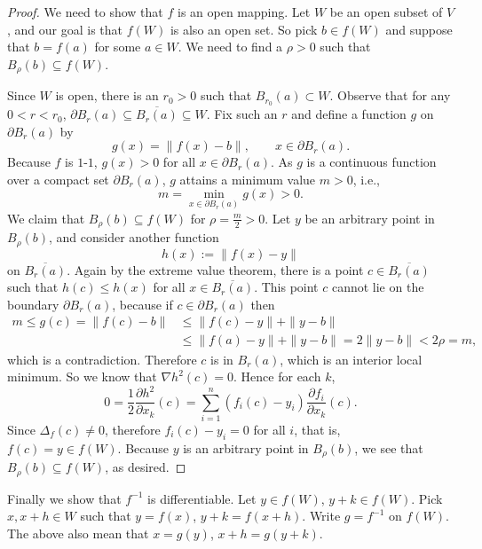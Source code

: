 \documentclass[11pt]{article}
\begin{document}
\begin{proof}
  We need to show that $f$ is an open mapping.
  Let $W$ be an open subset of $V$, and our goal is that $f(W)$ is also an open set.
  So pick $b \in f(W)$ and suppose that $b = f(a)$ for some $a \in W$.
  We need to find a $\rho > 0$ such that $B_\rho(b) \subseteq f(W)$.
  
  Since $W$ is open, there is an $r_0 > 0$ such that $B_{r_0}(a) \subset W$.
  Observe that for any $0 < r < r_0$, $\partial B_r(a) \subseteq \overline{B_r(a)} \subseteq W$.
  Fix such an $r$ and define a function $g$ on $\partial B_r(a)$ by
  \begin{equation*}
    g(x) = \| f(x) - b \|, \qquad x \in \partial B_r(a).
  \end{equation*}
  Because $f$ is $1$-$1$, $g(x) > 0$ for all $x \in \partial B_r(a)$.
  As $g$ is a continuous function over a compact set $\partial B_r(a)$, $g$ attains a minimum value $m > 0$, i.e.,
  \begin{equation*}
    m = \min_{x \in \partial B_r(a)} g(x) > 0.
  \end{equation*}
  We claim that $B_\rho(b) \subseteq f(W)$ for $\rho = \frac{m}{2} > 0$.
  Let $y$ be an arbitrary point in $B_\rho(b)$, and consider another function $$h(x) := \| f(x) - y \|$$ on $\overline{B_r(a)}$.
  Again by the extreme value theorem, there is a point $c \in \overline{B_r(a)}$ such that $h(c) \leqslant h(x)$ for all $x \in \overline{B_r(a)}$.
  This point $c$ cannot lie on the boundary $\partial B_r(a)$, because if $c \in \partial B_r(a)$ then 
  \begin{align*}
    m \leqslant g(c) = \| f(c) - b \| &\leqslant \| f(c) - y \| + \| y - b \| \\
    &\leqslant \| f(a) - y \| + \| y - b \| = 2 \| y - b \| < 2 \rho =m,
  \end{align*}
  which is a contradiction.
  Therefore $c$ is in $B_r(a)$, which is an interior local minimum.
  So we know that $\nabla h^2(c) = 0$. Hence for each $k$,
  \begin{equation*}
    0 = \frac{1}{2} \frac{\partial h^2}{\partial x_k} (c) 
    = \sum_{i=1}^n (f_i(c) - y_i) \frac{\partial f_i}{\partial x_k}(c).
  \end{equation*}
  Since $\Delta_f(c) \neq 0$, therefore $f_i(c) - y_i = 0$ for all $i$, that is, $f(c) = y \in f(W)$.
  Because $y$ is an arbitrary point in $B_\rho(b)$, we see that $B_\rho(b) \subseteq f(W)$, as desired.
\end{proof}

Finally we show that $f^{-1}$ is differentiable.
Let $y \in f(W)$, $y + k \in f(W)$.
Pick $x, x+h \in W$ such that $y = f(x)$, $y + k = f(x+h)$.
Write $g = f^{-1}$ on $f(W)$.  The above also mean that $x = g(y)$, $x+h = g(y+k)$.
\end{document}
